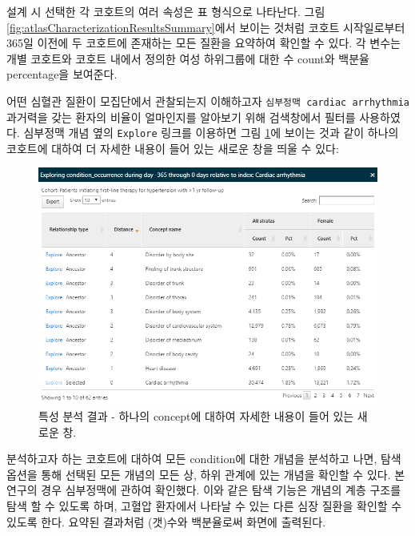 \documentclass[10.5pt]{book}
\theoremstyle{definition}
\theoremstyle{definition}
\theoremstyle{definition}
\theoremstyle{remark}
\begin{document}
설계 시 선택한 각 코호트의 여러 속성은 표 형식으로 나타난다. 그림
\ref{fig:atlasCharacterizationResultsSummary}에서 보이는 것처럼 코호트
시작일로부터 365일 이전에 두 코호트에 존재하는 모든 질환을 요약하여
확인할 수 있다. 각 변수는 개별 코호트와 코호트 내에서 정의한 여성
하위그룹에 대한 수 count와 백분율 percentage을 보여준다.

어떤 심혈관 질환이 모집단에서 관찰되는지 이해하고자
\texttt{심부정맥\ cardiac\ arrhythmia} 과거력을 갖는 환자의 비율이
얼마인지를 알아보기 위해 검색창에서 필터를 사용하였다. 심부정맥 개념
옆의 \texttt{Explore} 링크를 이용하면 그림
\ref{fig:atlasCharacterizationResultsExplore}에 보이는 것과 같이 하나의
코호트에 대하여 더 자세한 내용이 들어 있는 새로운 창을 띄울 수 있다:

\begin{figure}

{\centering \includegraphics[width=1\linewidth]{images/Characterization/atlasCharacterizationResultsExplore} 

}

\caption{특성 분석 결과 - 하나의 concept에 대하여 자세한 내용이 들어 있는 새로운 창.}\label{fig:atlasCharacterizationResultsExplore}
\end{figure}

분석하고자 하는 코호트에 대하여 모든 condition에 대한 개념을 분석하고
나면, 탐색 옵션을 통해 선택된 모든 개념의 모든 상, 하위 관계에 있는
개념을 확인할 수 있다. 본 연구의 경우 심부정맥에 관하여 확인했다. 이와
같은 탐색 기능은 개념의 계층 구조를 탐색 할 수 있도록 하며, 고혈압
환자에서 나타날 수 있는 다른 심장 질환을 확인할 수 있도록 한다. 요약된
결과처럼 (갯)수와 백분율로써 화면에 출력된다.
\end{document}

